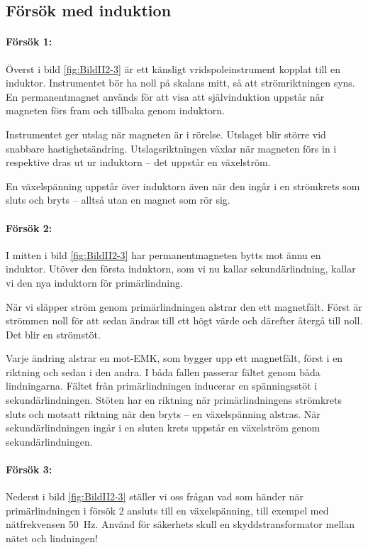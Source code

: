 \subsection{Försök med induktion}


\paragraph{Försök 1:}
Överst i bild \ref{fig:BildII2-3} är ett känsligt vridspoleinstrument kopplat
till en induktor.
Instrumentet bör ha noll på skalans mitt, så att strömriktningen syns.
En permanentmagnet används för att visa att självinduktion uppstår när
magneten förs fram och tillbaka genom induktorn.

Instrumentet ger utslag när magneten är i rörelse. Utslaget blir större vid
snabbare hastighetsändring. Utslagsriktningen växlar när magneten förs in i
respektive dras ut ur induktorn -- det uppstår en växelström.

En växelspänning uppstår över induktorn även när den ingår i en strömkrets som
sluts och bryts -- alltså utan en magnet som rör sig.

\paragraph{Försök 2:}
I mitten i bild \ref{fig:BildII2-3} har permanentmagneten bytts mot ännu en
induktor.
Utöver den första induktorn, som vi nu kallar sekundärlindning, kallar vi den
nya induktorn för primärlindning.

När vi släpper ström genom primärlindningen alstrar den ett magnetfält.
Först är strömmen noll för att sedan ändras till ett högt värde och därefter
återgå till noll. Det blir en strömstöt.

Varje ändring alstrar en mot-EMK, som bygger upp ett magnetfält, först i en
riktning och sedan i den andra. I båda fallen passerar fältet genom båda
lindningarna. Fältet från primärlindningen inducerar en spänningsstöt i
sekundärlindningen. Stöten har en riktning när primärlindningens strömkrets
sluts och motsatt riktning när den bryts -- en växelspänning alstras.
När sekundärlindningen ingår i en sluten krets uppstår en växelström genom
sekundärlindningen.

\paragraph{Försök 3:}
Nederst i bild \ref{fig:BildII2-3} ställer vi oss frågan vad som händer när
primärlindningen i försök 2 ansluts till en växelspänning, till exempel
med nätfrekvensen \SI{50}{\hertz}.
Använd för säkerhets skull en skyddstransformator mellan nätet och lindningen!

